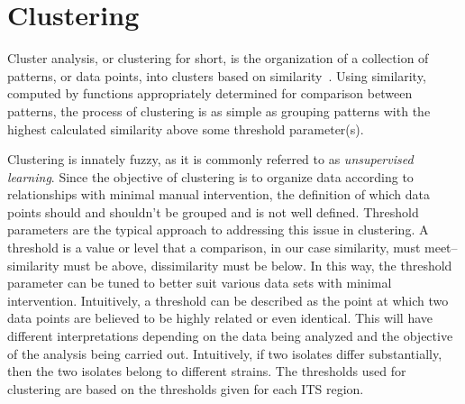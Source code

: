 \documentclass[12pt]{ucthesis}
\begin{document}
   \section{Clustering}\label{sec:clustering}
      Cluster analysis, or clustering for short, is the organization of a
      collection of patterns, or data points, into clusters based on
      similarity~\cite{Jain:DataClustering}. Using similarity, computed by
      functions appropriately determined for comparison between patterns, the
      process of clustering is as simple as grouping patterns with the highest
      calculated similarity above some threshold parameter(s).

      Clustering is innately fuzzy, as it is commonly referred to as
      \textit{unsupervised learning}. Since the objective of clustering is to
      organize data according to relationships with minimal manual
      intervention, the definition of which data points should and shouldn't be
      grouped and is not well defined. Threshold parameters are the typical
      approach to addressing this issue in clustering. A threshold is a value
      or level that a comparison, in our case similarity, must meet--similarity
      must be above, dissimilarity must be below. In this way, the threshold
      parameter can be tuned to better suit various data sets with minimal
      intervention. Intuitively, a threshold can be described as the point at
      which two data points are believed to be highly related or even
      identical. This will have different interpretations depending on the data
      being analyzed and the objective of the analysis being carried out.
      Intuitively, if two isolates differ substantially, then the two isolates
      belong to different strains. The thresholds used for clustering are based
      on the thresholds given for each ITS region.
   
\end{document}
